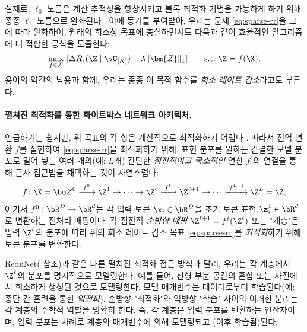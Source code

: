\documentclass[../../book-main_ko.tex]{subfiles}
\begin{document}
실제로, $\ell_0$ 노름은 계산 추적성을 향상시키고 볼록 최적화 기법을 가능하게 하기 위해 종종 $\ell_1$ 노름으로 완화된다 \cite{Wright-Ma-2022}. 이에 동기를 부여받아, 우리는 문제 \eqref{eq:sparse-rr}을 그에 따라 완화하여, 원래의 희소성 목표에 충실하면서도 다음과 같이 효율적인 알고리즘에 더 적합한 공식을 도출한다:
\begin{equation}
\begin{aligned}
   \max_{f \in \mathcal{F}}\ [\Delta R_{\epsilon}(\Z \mid \vU_{[K]}) - \lambda \|\bm{Z}\|_1]  \qquad \text{s.t.}\ \Z = f(\X),
   \label{eq:sparse-rr-1}
\end{aligned}
\end{equation}
용어의 약간의 남용과 함께, 우리는 종종 이 목적 함수를 \textit{희소 레이트 감소}라고도 부른다.

\paragraph{펼쳐진 최적화를 통한 화이트박스 네트워크 아키텍처.}


언급하기는 쉽지만, 위 목표의 각 항은 계산적으로 최적화하기 어렵다 \cite{Wright-Ma-2022}. 따라서 전역 변환 $f$를 실현하여 
\eqref{eq:sparse-rr}을 최적화하기 위해, 표현 분포를 원하는 간결한 모델 분포로 밀어 넣는 여러 개의(예: $L$개) 간단한 \textit{점진적이고 국소적인} 연산 $f^\ell$의 연결을 통해 근사 접근법을 채택하는 것이 자연스럽다:
\begin{equation}
f\colon \X = \bm Z^0 \xrightarrow{\hspace{1mm} f^0 \hspace{1mm}} \Z^1 \rightarrow \cdots \rightarrow \Z^\ell \xrightarrow{\hspace{1mm} f^{\ell} \hspace{1mm}} \Z^{\ell+1} \rightarrow  \cdots \xrightarrow{\hspace{1mm} f^{L-1}} \Z^L = \Z,
\label{eq:incremental}
\end{equation}
여기서 $f^0: \bR^{D} \rightarrow \bR^{d}$는 각 입력 토큰 $\x_{i} \in \bR^{D}$을 초기 토큰 표현 $\z_{i}^{1} \in \bR^{d}$로 변환하는 전처리 매핑이다.
각 점진적 \textit{순방향 매핑} $\Z^{\ell + 1} = f^\ell(\Z^\ell)$ 또는 "계층"은 입력 $\Z^\ell$의 분포에 따라 위의 희소 레이트 감소 목표 \eqref{eq:sparse-rr}를 \textit{최적화}하기 위해 토큰 분포를 변환한다.

\begin{remark}
    ReduNet( 참조)과 같은 다른 펼쳐진 최적화 접근 방식과 달리, 우리는 각 계층에서 $\Z^\ell$의 분포를 명시적으로 모델링한다. 예를 들어, 선형 부분 공간의 혼합 또는 사전에서 희소하게 생성된 것으로 모델링한다. 모델 매개변수는 데이터로부터 학습된다(예: 종단 간 훈련을 통한 \textit{역전파}). 순방향 "최적화"와 역방향
"학습" 사이의 이러한 분리는 각 계층의 수학적 역할을 명확히 한다. 즉, 각 계층은 입력 분포를 변환하는 연산자이며, 입력 분포는 차례로 계층의 매개변수에 의해 모델링되고 (이후 학습됨)된다.
\end{remark}
\end{document}
